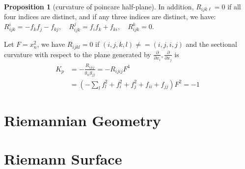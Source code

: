 \documentclass[12pt,a4paper]{book}
\theoremstyle{definition}
\newtheorem{prop}[defn]{Proposition}
\begin{document}
\begin{prop}[curvature of poincare half-plane]
    In addition, $R_{i j k \ell}=0$ if all four indices are distinct,
    and if any three indices are distinct, we have:
    $R_{i j k}^i=-f_k f_j-f_{k j}, \quad R_{i j k}^j=f_i f_k+f_{k i}, \quad R_{i j k}^k=0$.

    Let $F=x_n^2$, we have $R_{ijkl}=0$ if $(i,j,k,l)\neq =(i,j,i,j)$ and
    the sectional curvature with respect to the plane generated by $\frac{\partial}{\partial x_i}, \frac{\partial}{\partial x_j}$ is
    $$
        \begin{aligned}
            K_{p} & =-\frac{R_{i j i j}}{g_{i i} g_{j j}}=-R_{i j i j} F^4          \\
                  & =\left(-\sum_l f_l^2+f_i^2+f_j^2+f_{i i}+f_{j j}\right) F^2 =-1
        \end{aligned}
    $$

\end{prop}

\chapter{Riemannian Geometry}


\chapter{Riemann Surface}
\end{document}
